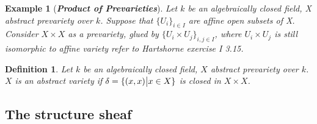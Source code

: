 \documentclass{ctexart}
\newtheorem{definition}{Definition}[section]
\newtheorem{example}{Example}[section]
\begin{document}
\begin{example}[\textbf{\emph{Product of Prevarieties}}]
    Let $k$ be an algebraically closed field, X abstract prevariety over $k$.
    Suppose that $\{U_{i}\}_{i\in I}$ are affine open subsets of X.
    Consider $X \times X$ as a prevariety, glued by $\{U_{i} \times U_{j}\}_{i,j\in I}$,
    where $U_{i} \times U_{j}$ is still isomorphic to affine variety refer to Hartshorne exercise I 3.15.
\end{example}
\begin{definition}
    Let $k$ be an algebraically closed field, $X$ abstract prevariety over $k$.
    $X$ is an abstract variety if $\delta = \{(x, x) \big{|} x\in X\}$ is closed in $X \times X$. 
\end{definition}

\subsection{The structure sheaf}
\label{subsection:Schemes_The_structure_sheaf}
\end{document}
